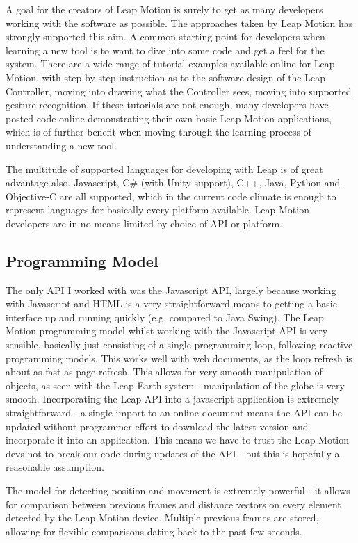 \documentclass{sigplanconf}
\begin{document}
A goal for the creators of Leap Motion is surely to get as many developers working with the software as possible. The approaches taken by Leap Motion has strongly supported this aim. A common starting point for developers when learning a new tool is to want to dive into some code and get a feel for the system. There are a wide range of tutorial examples available online for Leap Motion, with step-by-step instruction as to the software design of the Leap Controller, moving into drawing what the Controller sees, moving into supported gesture recognition. If these tutorials are not enough, many developers have posted code online demonstrating their own basic Leap Motion applications, which is of further benefit when moving through the learning process of understanding a new tool. 

The multitude of supported languages for developing with Leap is of great advantage also. Javascript, C\# (with Unity support), C++, Java, Python and Objective-C are all supported, which in the current code climate is enough to represent languages for basically every platform available. Leap Motion developers are in no means limited by choice of API or platform.

\subsection{Programming Model}

The only API I worked with was the Javascript API, largely because working with Javascript and HTML is a very straightforward means to getting a basic interface up and running quickly (e.g. compared to Java Swing). The Leap Motion programming model whilst working with the Javascript API is very sensible, basically just consisting of a single programming loop, following reactive programming models. This works well with web documents, as the loop refresh is about as fast as page refresh. This allows for very smooth manipulation of objects, as seen with the Leap Earth system - manipulation of the globe is very smooth. Incorporating the Leap API into a javascript application is extremely straightforward - a single import to an online document means the API can be updated without programmer effort to download the latest version and incorporate it into an application. This means we have to trust the Leap Motion devs not to break our code during updates of the API - but this is hopefully a reasonable assumption. 

The model for detecting position and movement is extremely powerful - it allows for comparison between previous frames and distance vectors on every element detected by the Leap Motion device. Multiple previous frames are stored, allowing for flexible comparisons dating back to the past few seconds. 
\end{document}
